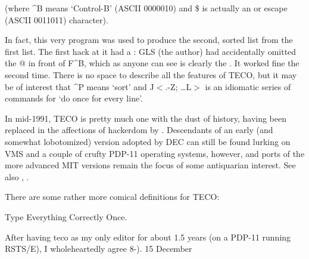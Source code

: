 (where \^{}B means `Control-B' (ASCII 0000010) and \$ is actually an  or escape (ASCII 0011011) character).

In fact, this very program was used to produce the second, sorted list from the first list. The first hack at it had a : GLS
(the author) had accidentally omitted the @ in front of F\^{}B, which as anyone can see is clearly the . It worked
fine the second time. There is no space to describe all the features of TECO, but it may be of interest that \^{}P means `sort' and
J$<$.-Z; \dots L$>$ is an idiomatic series of commands for `do once for every line'.

In mid-1991, TECO is pretty much one with the dust of history, having been replaced in the affections of hackerdom by .
Descendants of an early (and somewhat lobotomized) version adopted by DEC can still be found lurking on VMS and a couple of crufty PDP-11
operating systems, however, and ports of the more advanced MIT versions remain the focus of some antiquarian interest. See also
, .

\begin{new}
	There are some rather more comical definitions for TECO:

	\begin{usenet}
		Type Everything Correctly Once.

		After having teco as my only editor for about 1.5 years (on a PDP-11 running RSTS/E), I wholeheartedly agree 8-).
			{15 December}
	\end{usenet}
\end{new}


